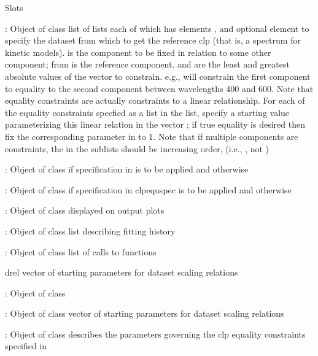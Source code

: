 \documentclass{article}
\begin{document}
\begin{Section}{Slots}
{\item[\code{clpequspec}:] Object of class  list of lists each of which has elements , and optional element  to specify the dataset
from which to get the reference clp (that is, a spectrum for kinetic 
models).   is the component to be fixed in relation to some other 
component; from is the reference component.   and  
are the 
least and greatest absolute values of the  vector to constrain. 
e.g., 
will constrain the first component to equality to the second component 
between wavelengths 400 and 600.  Note that equality constraints are
actually constraints to a linear relationship.  For each of the equality
constraints specfied as a list in the  list, specify a
starting value parameterizing this linear relation in the vector
; if true equality is desired then fix the corresponding
parameter in  to 1.  Note that if multiple components are
constraints, the  in the sublists should be increasing order, 
(i.e., , not )
\item[\code{lclp0}:] Object of class   if specification in  
is to be applied and  otherwise 
\item[\code{lclpequ}:] Object of class   if specification in clpequspec 
is to be applied and  otherwise
\item[\code{title}:] Object of class  displayed on output plots
\item[\code{mhist}:] Object of class   list describing fitting history
\item[\code{datCall}:] Object of class  list of calls to functions
\item[drel] vector of starting parameters for dataset scaling relations
\item[\code{dscalspec}:] Object of class  
\item[\code{drel}:] Object of class   vector of starting parameters for dataset scaling relations
\item[\code{clpequ}:] Object of class   describes the
parameters governing the clp equality constraints specified in 
}
\end{Section}
\end{document}
